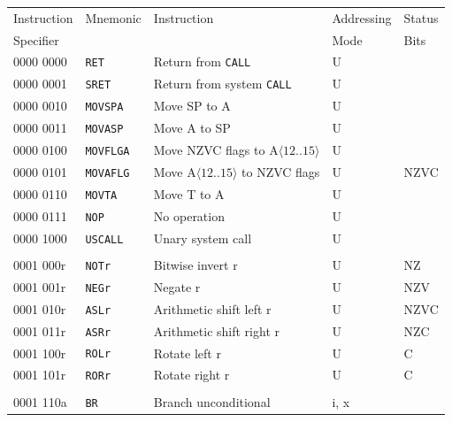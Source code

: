 \documentclass[10pt,fleqn]{book}
\begin{document}
\begin{tabular}{ l l l l l }
\toprule
Instruction & Mnemonic       & Instruction                                 & Addressing    & Status\\
Specifier   &                &                                             & Mode          & Bits\\
\midrule

0000 0000   & \verb|RET|     & Return from \verb|CALL|                     & U \\
0000 0001   & \verb|SRET|    & Return from system \verb|CALL|              & U \\
0000 0010   & \verb|MOVSPA|  & Move SP to A                                & U \\
0000 0011   & \verb|MOVASP|  & Move A to SP                                & U \\  
0000 0100   & \verb|MOVFLGA| & Move NZVC flags to A$\langle12..15\rangle$  & U \\
0000 0101   & \verb|MOVAFLG| & Move A$\langle12..15\rangle$ to NZVC flags  & U  & NZVC\\
0000 0110   & \verb|MOVTA|   & Move T to A                                & U \\
0000 0111   & \verb|NOP|     & No operation                                & U \\
0000 1000   & \verb|USCALL|  & Unary system call                           & U \\
 \\
0001 000r   & \verb|NOTr|    & Bitwise invert r                            & U                    & NZ \\
0001 001r   & \verb|NEGr|    & Negate r                                    & U                    & NZV \\
0001 010r   & \verb|ASLr|    & Arithmetic shift left r                     & U                    & NZVC \\
0001 011r   & \verb|ASRr|    & Arithmetic shift right r                    & U                    & NZC \\
0001 100r   & \verb|ROLr|    & Rotate left r                               & U                    & C \\
0001 101r   & \verb|RORr|    & Rotate right r                              & U                    & C \\
 \\
0001 110a   & \verb|BR|      & Branch unconditional                        & i, x \\

\end{tabular}
\end{document}
